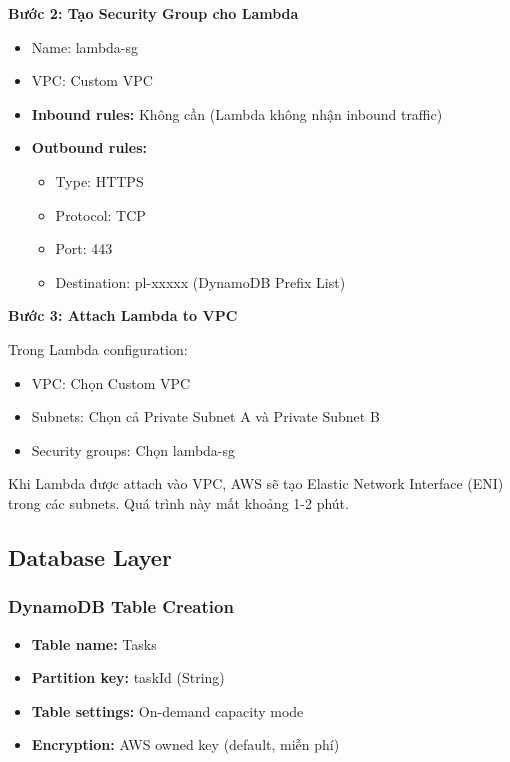 \textbf{Bước 2: Tạo Security Group cho Lambda}

\begin{itemize}
    \item Name: lambda-sg
    \item VPC: Custom VPC
    \item \textbf{Inbound rules:} Không cần (Lambda không nhận inbound traffic)
    \item \textbf{Outbound rules:}
    \begin{itemize}
        \item Type: HTTPS
        \item Protocol: TCP
        \item Port: 443
        \item Destination: pl-xxxxx (DynamoDB Prefix List)
    \end{itemize}
\end{itemize}

\textbf{Bước 3: Attach Lambda to VPC}

Trong Lambda configuration:
\begin{itemize}
    \item VPC: Chọn Custom VPC
    \item Subnets: Chọn cả Private Subnet A và Private Subnet B
    \item Security groups: Chọn lambda-sg
\end{itemize}

Khi Lambda được attach vào VPC, AWS sẽ tạo Elastic Network Interface (ENI) trong các subnets. Quá trình này mất khoảng 1-2 phút.

\subsection{Database Layer}
\label{ssec:database_impl}

\subsubsection{DynamoDB Table Creation}

\begin{itemize}
    \item \textbf{Table name:} Tasks
    \item \textbf{Partition key:} taskId (String)
    \item \textbf{Table settings:} On-demand capacity mode
    \item \textbf{Encryption:} AWS owned key (default, miễn phí)
\end{itemize}

